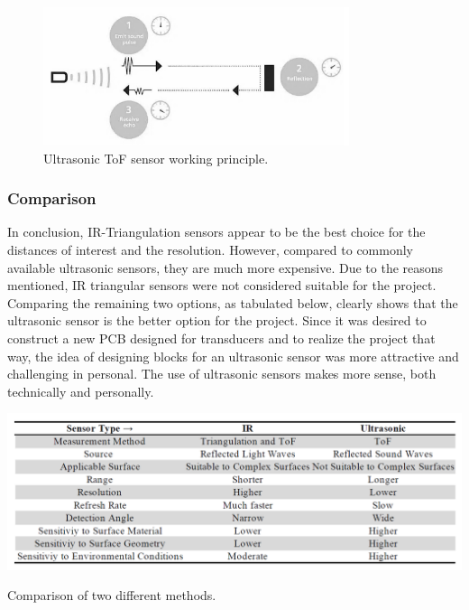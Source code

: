 \documentclass[12pt, a4paper]{article}
\begin{document}
                \begin{figure}[H]\centering
                    \includegraphics[width=0.8\textwidth]{ultrasonic.png}
                    \caption[]{Ultrasonic ToF sensor working principle.}\label{fig:ultrasonic}
                \end{figure}




        \subsubsection{Comparison}
            In conclusion, IR-Triangulation sensors appear to be the best choice for the distances of interest and the resolution. However, compared to commonly available ultrasonic sensors, they are much more expensive. Due to the reasons mentioned, IR triangular sensors were not considered suitable for the project. Comparing the remaining two options, as tabulated below, clearly shows that the ultrasonic sensor is the better option for the project. Since it was desired to construct a new PCB designed for transducers and to realize the project that way, the idea of designing blocks for an ultrasonic sensor was more attractive and challenging  in personal. The use of ultrasonic sensors makes more sense, both technically and personally.

            \begin{table}[H]\centering
                \includegraphics[width=\textwidth]{comparison.png}
                \caption[]{Comparison of two different methods.}\label{tab:comparison}
            \end{table}
\end{document}
